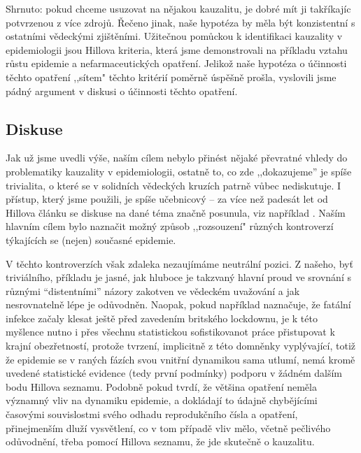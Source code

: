 Shrnuto: pokud chceme usuzovat na nějakou kauzalitu, je dobré mít ji takříkajíc potvrzenou z více zdrojů. Řečeno jinak, naše hypotéza by měla být konzistentní s ostatními vědeckými zjištěními. Užitečnou pomůckou k identifikaci kauzality v epidemiologii jsou Hillova kriteria, která jsme demonstrovali na příkladu vztahu růstu epidemie a nefarmaceutických opatření. Jelikož naše hypotéza o účinnosti těchto opatření ,,sítem" těchto kritérií poměrně úspěšně prošla, vyslovili jsme pádný argument v diskusi o účinnosti těchto opatření.

\subsection*{Diskuse}

Jak už jsme uvedli výše, naším cílem nebylo přinést nějaké převratné
vhledy do problematiky kauzality v epidemiologii, ostatně to, co zde
,,dokazujeme'' je spíše trivialita, o které se v solidních vědeckých
kruzích patrně vůbec nediskutuje. I přístup, který jsme použili, je
spíše učebnicový -- za více než padesát let od Hillova článku se
diskuse na dané téma značně posunula, viz například \cite{rothman2005causation}.
Naším hlavním cílem bylo naznačit možný způsob ,,rozsouzení" různých kontroverzí týkajících se (nejen) současné epidemie. 

V těchto kontroverzích však zdaleka nezaujímáme neutrální pozici. Z našeho, byť triviálního, příkladu je jasné, jak hluboce je takzvaný hlavní proud ve srovnání s různými ``distentními''
názory zakotven ve vědeckém uvažování a jak nesrovnatelně lépe je
odůvodněn. Naopak, pokud například \cite{wood2021inferring} naznačuje, že fatální infekce
začaly klesat ještě před zavedením britského lockdownu, je k této
myšlence nutno i přes všechnu statistickou sofistikovanot práce přistupovat
k krajní obezřetností, protože tvrzení, implicitně z této domněnky
vyplývající, totiž že epidemie se v raných fázích svou vnitřní dynamikou
sama utlumí, nemá kromě uvedené statistické evidence (tedy první podmínky) podporu v žádném dalším bodu Hillova seznamu. Podobně pokud \cite{KomarekStraka2021} tvrdí, že většina opatření neměla významný vliv na dynamiku epidemie, a dokládají to údajně chybějícími časovými souvislostmi svého odhadu reprodukčního čísla a opatření, přinejmenším dluží vysvětlení, co v tom případě vliv mělo, včetně pečlivého odůvodnění, třeba pomocí Hillova seznamu, že jde skutečně o kauzalitu.

